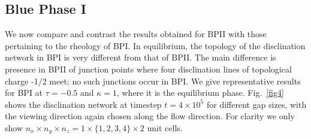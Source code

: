 \documentclass[12pt,twoside]{iopart}
\newcommand{\ex}[1]{\times10^{#1}}
\begin{document}
\subsection{Blue Phase I}\label{sec_bpi}

We now compare and contrast the results obtained for BPII with those
pertaining to the rheology of BPI. In equilibrium, the topology
of the disclination network in BPI is very different from that of BPII.
The main difference is presence in BPII of junction points where four
disclination lines of topological charge -1/2 meet; no such junctions
occur in BPI. We give representative results for BPI at $\tau=-0.5$
and $\kappa=1$, where it is the equilibrium phase.
Fig.~\ref{fig4} shows the disclination network at timestep $t=4\ex{5}$
for different gap sizes, with the viewing direction again chosen along
the flow direction.
For clarity we only show $n_x \times n_y \times n_z= 1 \times \{1,2,3,4\} \times 2$
unit cells.
\end{document}
